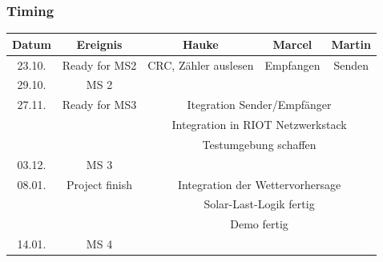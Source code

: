 \documentclass{beamer}
\begin{document}
\begin{frame}
	\frametitle{ Timing }
		\small
		\begin{tabular}{|c|c|c|c|c|}
		\hline 
		Datum  & Ereignis & Hauke & Marcel & Martin \\ 
		\hline 
		23.10. & Ready for MS2 & CRC, Zähler auslesen & Empfangen & Senden \\ 
		\hline 
		29.10. & MS 2 & & &\\
		\hline 
		27.11. & Ready for MS3 & \multicolumn{3}{|c|}{ Itegration Sender/Empfänger } \\
		&  & \multicolumn{3}{|c|}{ Integration in RIOT Netzwerkstack }\\
		&  & \multicolumn{3}{|c|}{ Testumgebung schaffen }\\
		\hline 
		03.12. & MS 3 & & & \\ 
		\hline 
	  08.01. & Project finish & \multicolumn{3}{|c|}{ Integration der Wettervorhersage } \\  
		&  & \multicolumn{3}{|c|}{ Solar-Last-Logik fertig }\\
		&  & \multicolumn{3}{|c|}{ Demo fertig }\\
		\hline
		14.01. & MS 4 & & & \\ 
		\hline 
		\end{tabular} 
\end{frame}
\end{document}
